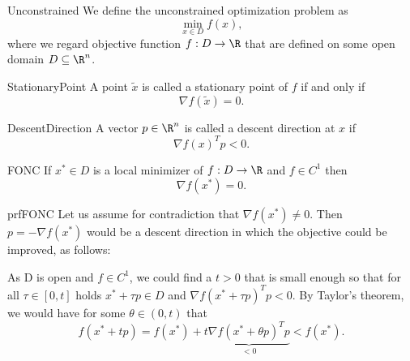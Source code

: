 \begin{theo}{Unconstrained}
    We define the unconstrained optimization problem as 
    \begin{equation*}
        \min_{x \in D} f(x),
    \end{equation*}
    where we regard objective function $f: D \to \R$ that are defined on some open domain $D \subseteq \R^n$.
\end{theo}

\begin{theo}{StationaryPoint}
    A point $\tilde{x}$ is called a stationary point of $f$ if and only if 
    \begin{equation*}
        \nabla f(\tilde{x}) = 0.
    \end{equation*}
    \vspace*{-0.5cm}
\end{theo}

\begin{theo}{DescentDirection}
    A vector $p \in \R^n$ is called a descent direction at $x$ if 
    \begin{equation*}
        \nabla f(x)^T p < 0.
    \end{equation*}
    \vspace*{-0.5cm}
\end{theo}

\begin{theo}{FONC}
    If $x^* \in D$ is a local minimizer of $f: D \to \R$ and $f \in C^1$ then 
    \begin{equation*}
        \nabla f(x^*) = 0.
    \end{equation*} 
    \vspace*{-0.5cm}
\end{theo}

\begin{prf}{prfFONC}
    Let us assume for contradiction that $\nabla f(x^*) \neq 0$. Then $p = -\nabla f(x^*)$ would be a descent direction in which the objective could be improved, as follows: 

    \begin{framed}
        As D is open and $f \in C^1$, we could find a $t > 0$ that is small enough so that for all $\tau \in [0,t]$ holds $x^* + \tau p \in D$ and $\nabla {f(x^* + \tau p)}^T p < 0$. By Taylor's theorem, we would have for some $\theta \in (0,t)$ that
        \begin{equation*}
            f(x^* + t p) = f(x^*) + t\underbrace{\nabla {f(x^* + \theta p)}^T p}_{<0} < f(x^*).
        \end{equation*}
        \vspace*{-0.3cm}
    \end{framed}
    \vspace*{-0.3cm}
\end{prf}

